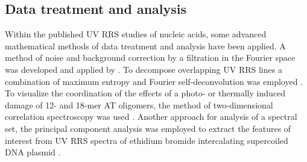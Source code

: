 \subsection{Data treatment and analysis}

Within the published UV RRS studies of nucleic acids, some advanced
mathematical methods of data treatment and analysis have been applied.
A method of noise and background correction by a filtration in the Fourier
space was developed and applied by
\textcite{Laigle1982}.
To decompose overlapping UV RRS lines a combination of maximum entropy and
Fourier self-deconvolution was employed
\parencite{Efremov1991}.
To visualize the coordination of the effects of a photo- or thermally induced
damage of 12- and 18-mer AT oligomers, the method of two-dimensional
correlation spectroscopy was used
\parencite{Jirasek2006}.
Another approach for analysis of a spectral set, the principal component
analysis was employed to extract the features of interest from UV RRS spectra
of ethidium bromide intercalating supercoiled DNA plasmid
\parencite{Neugebauer2007}.
